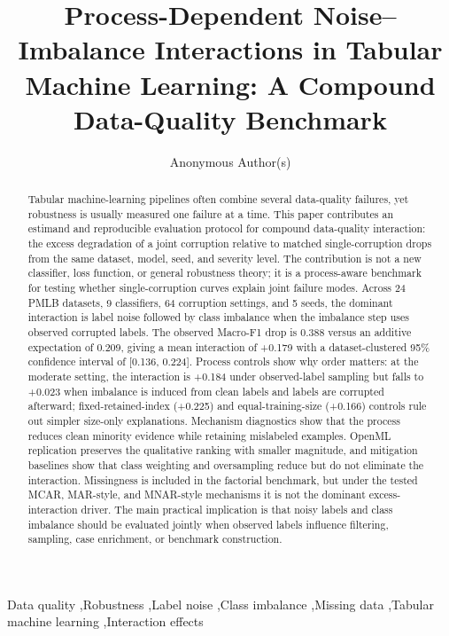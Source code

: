 \documentclass[preprint,12pt,number]{elsarticle}
\begin{document}
\begin{frontmatter}

\title{Process-Dependent Noise--Imbalance Interactions in Tabular Machine Learning: A Compound Data-Quality Benchmark}

\author[inst1]{Anonymous Author(s)}


\begin{abstract}
Tabular machine-learning pipelines often combine several data-quality failures, yet robustness is usually measured one failure at a time. This paper contributes an estimand and reproducible evaluation protocol for compound data-quality interaction: the excess degradation of a joint corruption relative to matched single-corruption drops from the same dataset, model, seed, and severity level. The contribution is not a new classifier, loss function, or general robustness theory; it is a process-aware benchmark for testing whether single-corruption curves explain joint failure modes. Across 24 PMLB datasets, 9 classifiers, 64 corruption settings, and 5 seeds, the dominant interaction is label noise followed by class imbalance when the imbalance step uses observed corrupted labels. The observed Macro-F1 drop is 0.388 versus an additive expectation of 0.209, giving a mean interaction of +0.179 with a dataset-clustered 95\% confidence interval of [0.136, 0.224]. Process controls show why order matters: at the moderate setting, the interaction is +0.184 under observed-label sampling but falls to +0.023 when imbalance is induced from clean labels and labels are corrupted afterward; fixed-retained-index (+0.225) and equal-training-size (+0.166) controls rule out simpler size-only explanations. Mechanism diagnostics show that the process reduces clean minority evidence while retaining mislabeled examples. OpenML replication preserves the qualitative ranking with smaller magnitude, and mitigation baselines show that class weighting and oversampling reduce but do not eliminate the interaction. Missingness is included in the factorial benchmark, but under the tested MCAR, MAR-style, and MNAR-style mechanisms it is not the dominant excess-interaction driver. The main practical implication is that noisy labels and class imbalance should be evaluated jointly when observed labels influence filtering, sampling, case enrichment, or benchmark construction.
\end{abstract}

\begin{keyword}
Data quality \sep Robustness \sep Label noise \sep Class imbalance \sep Missing data \sep Tabular machine learning \sep Interaction effects
\end{keyword}

\end{frontmatter}
\end{document}
